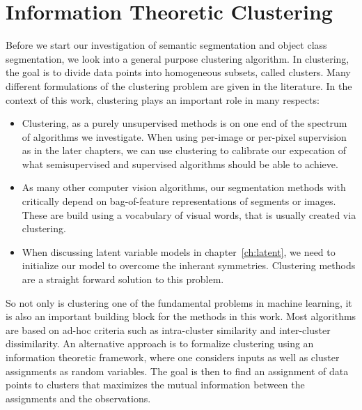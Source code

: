 \chapter{Information Theoretic Clustering}

Before we start our investigation of semantic segmentation and object class segmentation,
we look into a general purpose clustering algorithm.
%
In clustering, the goal is to divide data points into homogeneous subsets, called
clusters.
Many different formulations of the clustering problem are given in the literature.
%
In the context of this work, clustering plays an important role in many respects:
\begin{itemize}
    \item Clustering, as a purely unsupervised methods is on one end of the spectrum of algorithms we investigate.
        When using per-image or per-pixel supervision as in the later chapters, we can use clustering to calibrate our
        expecation of what semisupervised and supervised algorithms should be able to achieve.
    \item As many other computer vision algorithms, our segmentation methods
        with critically depend on bag-of-feature representations of segments or
        images. These are build using a vocabulary of visual words, that is
        usually created via clustering.
    \item When discussing latent variable models in chapter~\ref{ch:latent}, we need to initialize our
        model to overcome the inherant symmetries. Clustering methods are a
        straight forward solution to this problem.
\end{itemize}

So not only is clustering one of the fundamental problems in machine learning, it is also
an important building block for the methods in this work.
%
Most algorithms are based on ad-hoc criteria such as intra-cluster similarity
and inter-cluster dissimilarity.
An alternative approach is to formalize clustering using an information
theoretic framework, where one considers inputs as well as cluster assignments
as random variables.  The goal is then to find an assignment of data points to
clusters that maximizes the mutual information between the assignments and the
observations.

